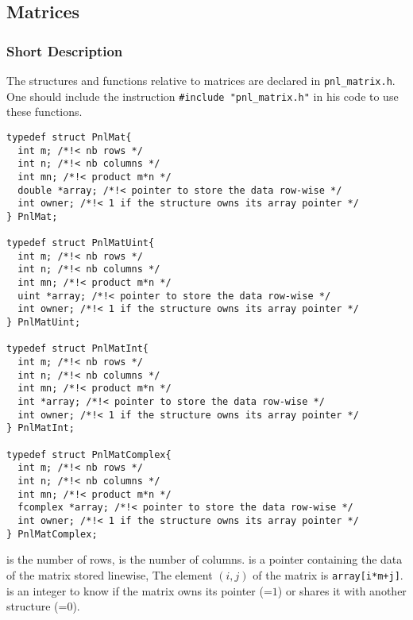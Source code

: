 
\subsection{Matrices}
\subsubsection{Short Description}

The structures and functions relative to matrices are declared in
\verb!pnl_matrix.h!. One should include the instruction
\verb!#include "pnl_matrix.h"! in his code to use these functions.

\begin{verbatim}
typedef struct PnlMat{
  int m; /*!< nb rows */ 
  int n; /*!< nb columns */ 
  int mn; /*!< product m*n */
  double *array; /*!< pointer to store the data row-wise */
  int owner; /*!< 1 if the structure owns its array pointer */
} PnlMat;

typedef struct PnlMatUint{
  int m; /*!< nb rows */ 
  int n; /*!< nb columns */ 
  int mn; /*!< product m*n */
  uint *array; /*!< pointer to store the data row-wise */
  int owner; /*!< 1 if the structure owns its array pointer */
} PnlMatUint;

typedef struct PnlMatInt{
  int m; /*!< nb rows */ 
  int n; /*!< nb columns */ 
  int mn; /*!< product m*n */
  int *array; /*!< pointer to store the data row-wise */
  int owner; /*!< 1 if the structure owns its array pointer */
} PnlMatInt;

typedef struct PnlMatComplex{
  int m; /*!< nb rows */ 
  int n; /*!< nb columns */ 
  int mn; /*!< product m*n */
  fcomplex *array; /*!< pointer to store the data row-wise */
  int owner; /*!< 1 if the structure owns its array pointer */
} PnlMatComplex;
\end{verbatim}
 is the number of rows,  is the number of columns. 
is a pointer containing the data of the matrix stored linewise, The element
$(i, j)$ of the matrix is \verb!array[i*m+j]!.  is an integer to
know if the matrix owns its  pointer (=$1$) or shares it
with another structure (=$0$).

